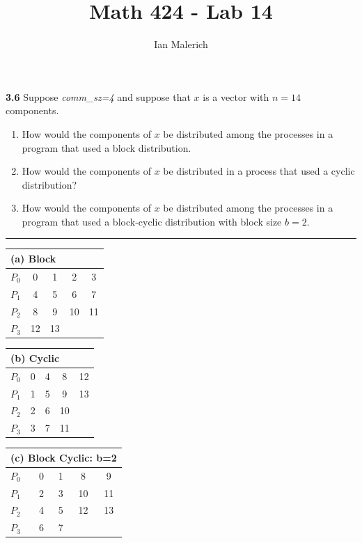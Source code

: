 \documentclass[12pt]{jhwhw}
\author{Ian Malerich}
\title{Math 424 - Lab 14}
\begin{document}
\raggedright


\textbf{3.6}
	Suppose \textit{comm\_sz=4} and suppose that $x$ is a vector with $n=14$ 
	components.
	\begin{enumerate}
		\item How would the components of $x$ be distributed among the processes in 
			a program that used a block distribution.
		\item How would the components of $x$ be distributed in a process that 
			used a cyclic distribution?
		\item How would the components of $x$ be distributed among the processes
			in a program that used a block-cyclic distribution with block size
			$b=2$.
	\end{enumerate}
\textcolor[RGB]{240,240,240}{\rule{\textwidth}{0.5pt}}\bigbreak
	
	\begin{centering}
	\begin{tabular}{|l|c|c|c|c|}
		\hline
		\multicolumn{5}{|l|}{(a) Block} \\ \hline
		$P_0$ & 0 & 1 & 2 & 3 \\ \hline
		$P_1$ & 4 & 5 & 6 & 7 \\ \hline
		$P_2$ & 8 & 9 & 10 & 11 \\ \hline
		$P_3$ & 12 & 13 & &  \\ \hline
	\end{tabular}

	\smallbreak
	\begin{tabular}{|l|c|c|c|c|}
		\hline
		\multicolumn{5}{|l|}{(b) Cyclic} \\ \hline
		$P_0$ & 0 & 4 & 8 & 12 \\ \hline
		$P_1$ & 1 & 5 & 9 & 13 \\ \hline
		$P_2$ & 2 & 6 & 10 &  \\ \hline
		$P_3$ & 3 & 7 & 11 &  \\ \hline
	\end{tabular}

	\smallbreak
	\begin{tabular}{|l|c|c|c|c|}
		\hline
		\multicolumn{5}{|l|}{(c) Block Cyclic: b=2} \\ \hline
		$P_0$ & 0 & 1 & 8 & 9 \\ \hline
		$P_1$ & 2 & 3 & 10 & 11 \\ \hline
		$P_2$ & 4 & 5 & 12 & 13 \\ \hline
		$P_3$ & 6 & 7 & &  \\ \hline
	\end{tabular}

	\end{centering}
\end{document}
